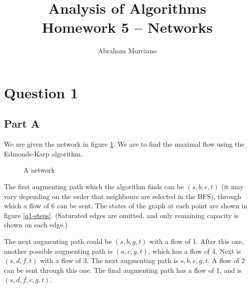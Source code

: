 \documentclass{article}
\title{Analysis of Algorithms \\
\medskip
\large Homework 5 -- Networks}
\author{Abraham Murciano}
\begin{document}
\maketitle

\section*{Question 1}

\subsection*{Part A}

We are given the network in figure \ref{q1}. We are to find the maximal flow using the Edmonds-Karp algorithm.

\begin{figure}[htbp]
	\centering
	\caption{A network}
	\label{q1}
\end{figure}

The first augmenting path which the algorithm finds can be \((s, b, e, t)\) (it may vary depending on the order that neighbours are selected in the BFS), through which a flow of 6 can be sent. The states of the graph at each point are shown in figure \ref{q1-steps}. (Saturated edges are omitted, and only remaining capacity is shown on each edge.)

The next augmenting path could be \((s, b, g, t)\) with a flow of 1. After this one, another possible augmenting path is \((a, c, g, t)\), which has a flow of 4. Next is \((s, d, f, t)\) with a flow of 3. The next augmenting path is \(s, b, e, g, t\). A flow of 2 can be sent through this one. The final augmenting path has a flow of 1, and is \((s, d, f, c, g, t)\).
\end{document}

